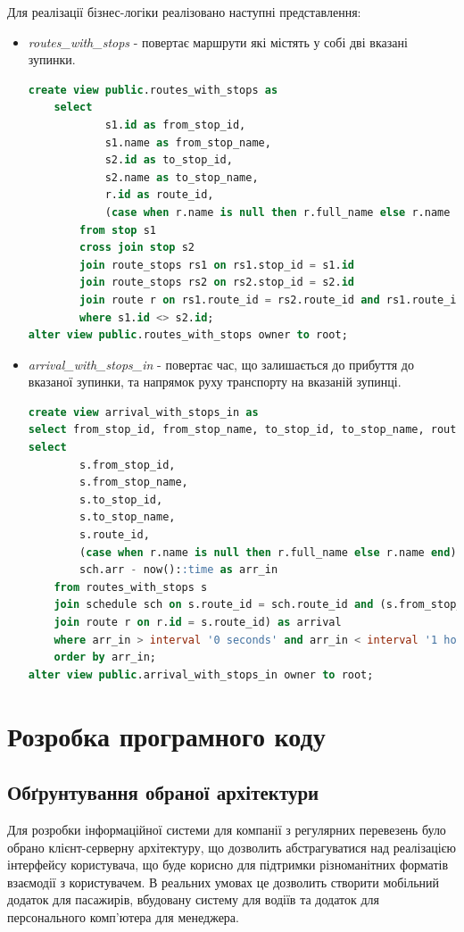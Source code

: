\documentclass[oneside,14pt]{extarticle}
\begin{document}
Для реалізації бізнес-логіки реалізовано наступні представлення:
\begin{itemize}
\item \textit{routes\_with\_stops} - повертає маршрути які містять у собі дві вказані зупинки.
{\fontsize{8pt}{8pt}\selectfont\begin{lstlisting}[language=sql]
create view public.routes_with_stops as
	select
			s1.id as from_stop_id,
			s1.name as from_stop_name,
			s2.id as to_stop_id,
			s2.name as to_stop_name,
			r.id as route_id,
			(case when r.name is null then r.full_name else r.name end) as route_name
		from stop s1
		cross join stop s2
		join route_stops rs1 on rs1.stop_id = s1.id
		join route_stops rs2 on rs2.stop_id = s2.id
		join route r on rs1.route_id = rs2.route_id and rs1.route_id = r.id
		where s1.id <> s2.id;
alter view public.routes_with_stops owner to root;
\end{lstlisting}}
\item \textit{arrival\_with\_stops\_in} - повертає час, що залишається до прибуття до вказаної зупинки, та напрямок руху транспорту на вказаній зупинці.
{\fontsize{8pt}{8pt}\selectfont\begin{lstlisting}[language=sql]
create view arrival_with_stops_in as
select from_stop_id, from_stop_name, to_stop_id, to_stop_name, route_id, route_name, to_char(arr_in, 'MI:SS') as arr_in from (
select
		s.from_stop_id,
		s.from_stop_name,
		s.to_stop_id,
		s.to_stop_name,
		s.route_id,
		(case when r.name is null then r.full_name else r.name end) as route_name,
		sch.arr - now()::time as arr_in
	from routes_with_stops s
	join schedule sch on s.route_id = sch.route_id and (s.from_stop_id = sch.stop_id or s.to_stop_id = sch.stop_id)
	join route r on r.id = s.route_id) as arrival
	where arr_in > interval '0 seconds' and arr_in < interval '1 hour'
	order by arr_in;
alter view public.arrival_with_stops_in owner to root;
\end{lstlisting}}
\end{itemize}

\newpage

\section{Розробка програмного коду}
\subsection{Обґрунтування обраної архітектури}
Для розробки інформаційної системи для компанії з регулярних перевезень було обрано клієнт-серверну архітектуру, що дозволить абстрагуватися над реалізацією інтерфейсу користувача, що буде корисно для підтримки різноманітних форматів взаємодії з користувачем. В реальних умовах це дозволить створити мобільний додаток для пасажирів, вбудовану систему для водіїв та додаток для персонального комп'ютера для менеджера.
\end{document}
